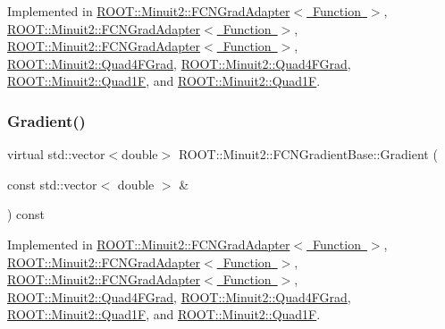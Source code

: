 Implemented in \mbox{\hyperlink{classROOT_1_1Minuit2_1_1FCNGradAdapter_ae91d0453fd5e953f75551576659d6c7b}{R\+O\+O\+T\+::\+Minuit2\+::\+F\+C\+N\+Grad\+Adapter$<$ Function $>$}}, \mbox{\hyperlink{classROOT_1_1Minuit2_1_1FCNGradAdapter_ae91d0453fd5e953f75551576659d6c7b}{R\+O\+O\+T\+::\+Minuit2\+::\+F\+C\+N\+Grad\+Adapter$<$ Function $>$}}, \mbox{\hyperlink{classROOT_1_1Minuit2_1_1FCNGradAdapter_ae91d0453fd5e953f75551576659d6c7b}{R\+O\+O\+T\+::\+Minuit2\+::\+F\+C\+N\+Grad\+Adapter$<$ Function $>$}}, \mbox{\hyperlink{classROOT_1_1Minuit2_1_1Quad4FGrad_afd3b64a4236e31bdf9c330e33ac7ac89}{R\+O\+O\+T\+::\+Minuit2\+::\+Quad4\+F\+Grad}}, \mbox{\hyperlink{classROOT_1_1Minuit2_1_1Quad4FGrad_afd3b64a4236e31bdf9c330e33ac7ac89}{R\+O\+O\+T\+::\+Minuit2\+::\+Quad4\+F\+Grad}}, \mbox{\hyperlink{classROOT_1_1Minuit2_1_1Quad1F_a5862cb7b7c00f86bcff155d0033abd7f}{R\+O\+O\+T\+::\+Minuit2\+::\+Quad1F}}, and \mbox{\hyperlink{classROOT_1_1Minuit2_1_1Quad1F_a5862cb7b7c00f86bcff155d0033abd7f}{R\+O\+O\+T\+::\+Minuit2\+::\+Quad1F}}.

\mbox{\label{classROOT_1_1Minuit2_1_1FCNGradientBase_a004740e7e25a1358aafde6694196ef88}} 
\subsubsection{\texorpdfstring{Gradient()}{Gradient()}\hspace{0.1cm}{\footnotesize\ttfamily [3/3]}}
{\footnotesize\ttfamily virtual std\+::vector$<$double$>$ R\+O\+O\+T\+::\+Minuit2\+::\+F\+C\+N\+Gradient\+Base\+::\+Gradient (\begin{DoxyParamCaption}\item[{const std\+::vector$<$ double $>$ \&}]{ }\end{DoxyParamCaption}) const\hspace{0.3cm}{\ttfamily [pure virtual]}}



Implemented in \mbox{\hyperlink{classROOT_1_1Minuit2_1_1FCNGradAdapter_ae91d0453fd5e953f75551576659d6c7b}{R\+O\+O\+T\+::\+Minuit2\+::\+F\+C\+N\+Grad\+Adapter$<$ Function $>$}}, \mbox{\hyperlink{classROOT_1_1Minuit2_1_1FCNGradAdapter_ae91d0453fd5e953f75551576659d6c7b}{R\+O\+O\+T\+::\+Minuit2\+::\+F\+C\+N\+Grad\+Adapter$<$ Function $>$}}, \mbox{\hyperlink{classROOT_1_1Minuit2_1_1FCNGradAdapter_ae91d0453fd5e953f75551576659d6c7b}{R\+O\+O\+T\+::\+Minuit2\+::\+F\+C\+N\+Grad\+Adapter$<$ Function $>$}}, \mbox{\hyperlink{classROOT_1_1Minuit2_1_1Quad4FGrad_afd3b64a4236e31bdf9c330e33ac7ac89}{R\+O\+O\+T\+::\+Minuit2\+::\+Quad4\+F\+Grad}}, \mbox{\hyperlink{classROOT_1_1Minuit2_1_1Quad4FGrad_afd3b64a4236e31bdf9c330e33ac7ac89}{R\+O\+O\+T\+::\+Minuit2\+::\+Quad4\+F\+Grad}}, \mbox{\hyperlink{classROOT_1_1Minuit2_1_1Quad1F_a5862cb7b7c00f86bcff155d0033abd7f}{R\+O\+O\+T\+::\+Minuit2\+::\+Quad1F}}, and \mbox{\hyperlink{classROOT_1_1Minuit2_1_1Quad1F_a5862cb7b7c00f86bcff155d0033abd7f}{R\+O\+O\+T\+::\+Minuit2\+::\+Quad1F}}.



